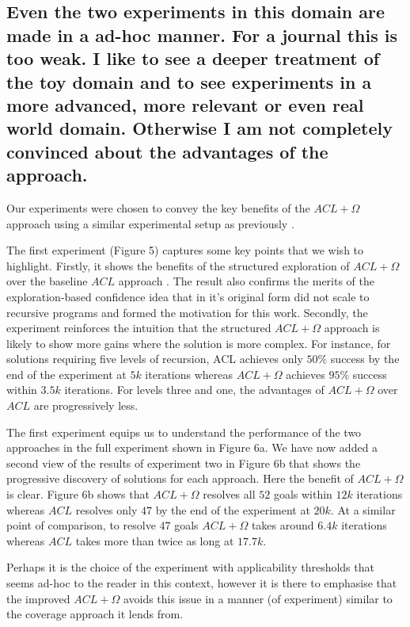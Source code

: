 \documentclass[preprint,12pt]{elsarticle}
\begin{document}
\subsection{Even the two experiments in this domain are made in a ad-hoc manner. For a journal this is too weak. I like to see a deeper treatment of the toy domain and to see experiments in a more advanced, more relevant or even real world domain. Otherwise I am not completely convinced about the advantages of the approach.}
\label{rev3:experiments}

Our experiments were chosen to convey the key benefits of the $ACL+\Omega$ approach using a similar experimental setup as previously \cite{Singh:AAMAS10}.

The first experiment (Figure 5) captures some key points that we wish to highlight. Firstly, it shows the benefits of the structured exploration of $ACL+\Omega$ over the baseline $ACL$ approach \cite{Airiau:IJAT09,Singh:AAMAS10}. The result also confirms the merits of the exploration-based confidence idea that in it's original form \cite{Singh:AAMAS10} did not scale to recursive programs and formed the motivation for this work. Secondly, the experiment reinforces the intuition that the structured $ACL+\Omega$ approach is likely to show more gains where the solution is more complex. For instance, for solutions requiring five levels of recursion, ACL achieves only $50\%$ success by the end of the experiment at $5k$ iterations whereas $ACL+\Omega$ achieves $95\%$ success within $3.5k$ iterations. For levels three and one, the advantages of $ACL+\Omega$ over $ACL$ are progressively less. 

The first experiment equips us to understand the performance of the two approaches in the full experiment shown in Figure 6a. We have now added a second view of the results of experiment two in Figure 6b that shows the progressive discovery of solutions for each approach. Here the benefit of $ACL+\Omega$ is clear. Figure 6b shows that $ACL+\Omega$ resolves all $52$ goals within $12k$ iterations whereas $ACL$ resolves only $47$ by the end of the experiment at $20k$. At a similar point of comparison, to resolve $47$ goals $ACL+\Omega$ takes around $6.4k$ iterations whereas $ACL$ takes more than twice as long at $17.7k$. 

Perhaps it is the choice of the experiment with applicability thresholds that seems ad-hoc to the reader in this context, however it is there to emphasise that the improved $ACL+\Omega$ avoids this issue in a manner  (of experiment) similar to the coverage approach \cite{Singh:AAMAS10} it lends from.
\end{document}
